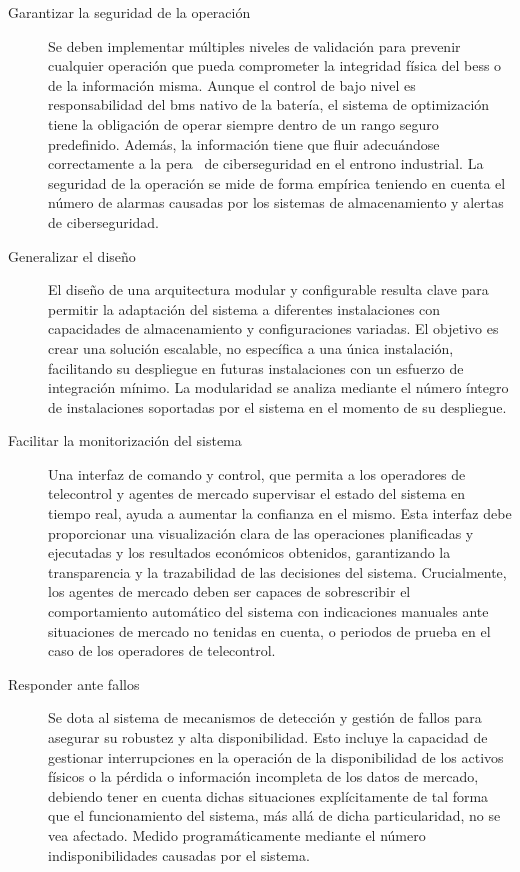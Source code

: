 \begin{description}
  \item[Garantizar la seguridad de la operación] Se deben implementar múltiples niveles de validación para prevenir cualquier operación que pueda comprometer la integridad física del \gls{bess} o de la información misma. Aunque el control de bajo nivel es responsabilidad del \gls{bms} nativo de la batería, el sistema de optimización tiene la obligación de operar siempre dentro de un rango seguro predefinido. Además, la información tiene que fluir adecuándose correctamente a la \gls{pera}~\cite{williams1994purdue} de ciberseguridad en el entrono industrial. La seguridad de la operación se mide de forma empírica teniendo en cuenta el número de alarmas causadas por los sistemas de almacenamiento y alertas de ciberseguridad.

  \item[Generalizar el diseño] El diseño de una arquitectura modular y configurable resulta clave para permitir la adaptación del sistema a diferentes instalaciones con capacidades de almacenamiento y configuraciones variadas. El objetivo es crear una solución escalable, no específica a una única instalación, facilitando su despliegue en futuras instalaciones con un esfuerzo de integración mínimo. La modularidad se analiza mediante el número íntegro de instalaciones soportadas por el sistema en el momento de su despliegue.

  \item[Facilitar la monitorización del sistema] Una interfaz de comando y control, que permita a los operadores de telecontrol y agentes de mercado supervisar el estado del sistema en tiempo real, ayuda a aumentar la confianza en el mismo. Esta interfaz debe proporcionar una visualización clara de las operaciones planificadas y ejecutadas y los resultados económicos obtenidos, garantizando la transparencia y la trazabilidad de las decisiones del sistema. Crucialmente, los agentes de mercado deben ser capaces de sobrescribir el comportamiento automático del sistema con indicaciones manuales ante situaciones de mercado no tenidas en cuenta, o periodos de prueba en el caso de los operadores de telecontrol.

  \item[Responder ante fallos] Se dota al sistema de mecanismos de detección y gestión de fallos para asegurar su robustez y alta disponibilidad. Esto incluye la capacidad de gestionar interrupciones en la operación de la disponibilidad de los activos físicos o la pérdida o información incompleta de los datos de mercado, debiendo tener en cuenta dichas situaciones explícitamente de tal forma que el funcionamiento del sistema, más allá de dicha particularidad, no se vea afectado. Medido programáticamente mediante el número indisponibilidades causadas por el sistema.


\end{description}
